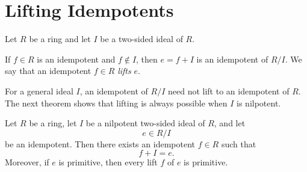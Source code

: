 \section{Lifting Idempotents}

\begin{definition}
    Let $R$ be a ring and let $I$ be a two-sided ideal of $R$.

    If $f\in R$ is an idempotent and $ f \notin I $, then $e=f+I$ is an idempotent of $R/I$. We say that an idempotent $f\in R$ \emph{lifts}
    $e$.
\end{definition}

\begin{remark}
    For a general ideal $I$, an idempotent of $R/I$ need not lift to an idempotent of $R$.
    The next theorem shows that lifting is always possible when $I$ is nilpotent.
\end{remark}

\begin{theorem}\label{thm:lift-idempotent}
    Let $R$ be a ring, let $I$ be a nilpotent two-sided ideal of $R$, and let
    \[
        e\in R/I
    \]
    be an idempotent. Then there exists an idempotent $f\in R$ such that
    \[
        f+I=e.
    \]
    Moreover, if $e$ is primitive, then every lift $f$ of $e$ is primitive.
\end{theorem}

